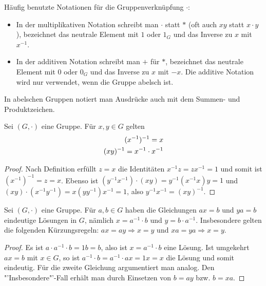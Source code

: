 \begin{remark}
	Häufig benutzte Notationen für die Gruppenverknüpfung $\cdot$:
	\begin{itemize}
		\item In der multiplikativen Notation schreibt man $\cdot$ statt $*$ (oft auch $xy$ statt 
		$x \cdot y$), bezeichnet das neutrale Element mit $1$ oder $1_G$ und das Inverse zu $x$ mit
		$x^{-1}$.
		\item In der additiven Notation schreibt man $+$ für $*$, bezeichnet das neutrale Element
		mit $0$ oder $0_G$ und das Inverse zu $x$ mit $-x$. Die additive Notation wird nur verwendet,
		wenn die Gruppe abelsch ist.
	\end{itemize}
\end{remark}

In abelschen Gruppen notiert man Ausdrücke auch mit dem Summen- und Produktzeichen. \\

\begin{proposition}
	Sei $(G,\cdot)$ eine Gruppe. Für $x,y \in G$ gelten
	\begin{align}
		(x^{-1})^{-1}=x \notag \\
		(xy)^{-1}=x^{-1} \cdot x^{-1} \notag
	\end{align}
\end{proposition}
\begin{proof}
	Nach Definition erfüllt $z=x$ die Identitäten $x^{-1}z=zx^{-1}=1$ und somit ist $(x^{-1})^{-1}=z=x$. Ebenso ist 
	$(y^{-1}x^{-1})\cdot (xy)=y^{-1}(x^{-1}x)y=1$ und $(xy)\cdot (x^{-1}y^{-1})=x(yy^{-1})x^{-1}=1$, also $y^{-1}
	x^{-1}=(xy)^{-1}$.
\end{proof}

\begin{proposition}
	Sei $(G,\cdot)$ eine Gruppe. Für $a,b \in G$ haben die Gleichungen $ax=b$ und
	$ya=b$ eindeutige Lösungen in $G$, nämlich $x=a^{-1} \cdot b$ und $y=b \cdot a^{-1}$. 
	Insbesondere gelten die folgenden Kürzungsregeln: $ax=ay \Rightarrow x=y$ und $xa=ya 
	\Rightarrow x=y$.
\end{proposition}
\begin{proof}
	Es ist $a \cdot a^{-1} \cdot b = 1b=b$, also ist $x=a^{-1} \cdot b$ eine Lösung. Ist umgekehrt
	$ax=b$ mit $x \in G$, so ist $a^{-1} \cdot b = a^{-1} \cdot ax = 1x = x$ die Lösung und somit
	eindeutig. Für die zweite Gleichung argumentiert man analog. Den "'Insbesondere"'-Fall erhält
	man durch Einsetzen von $b=ay$ bzw. $b=xa$.
\end{proof}

